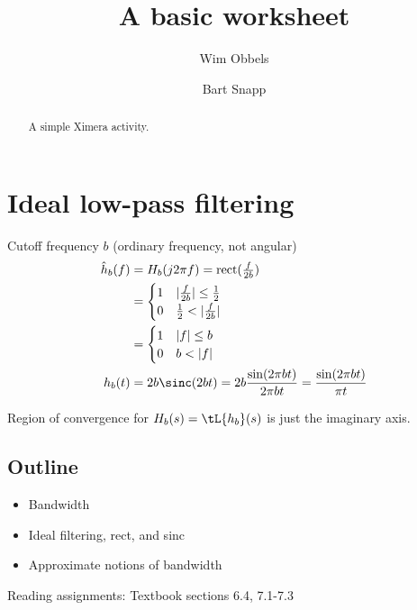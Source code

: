 \documentclass{ximera}
\title{A basic worksheet}
\author{Wim Obbels \and Bart Snapp}
\begin{document}
\begin{abstract}
    A simple Ximera activity.
\end{abstract}
\maketitle
\label{xim:aFirstActivity}


\section{Ideal low-pass filtering}
  Cutoff frequency $b$ (ordinary frequency, not angular)
    \begin{align*}
      \hat{h}_b(f)
      &= H_b(j2\pi f) = \operatorname{rect}(\tfrac{f}{2b})\\
      &= \begin{cases}
      1 & |\tfrac{f}{2b}| \leq \tfrac{1}{2}\\
      0 & \tfrac{1}{2} < |\tfrac{f}{2b}|
    \end{cases}\\
      &= \begin{cases}
      1 & |f| \leq b\\
      0 & b < |f|
    \end{cases}\\
      h_b(t)
      &= 2 b \sinc(2 b t) = 2 b\frac{\sin(2 \pi b t)}{2 \pi b t} = \frac{\sin(2 \pi b t)}{\pi t}
    \end{align*}

    Region of convergence for $H_b(s) = \tL{h_b}(s)$ is just the imaginary axis.\\


\subsection{Outline}
  \begin{itemize}
  \item Bandwidth
  \item Ideal filtering, rect, and sinc
  \item Approximate notions of bandwidth
  \end{itemize}
  Reading assignments: Textbook sections 6.4, 7.1-7.3


\end{document}
